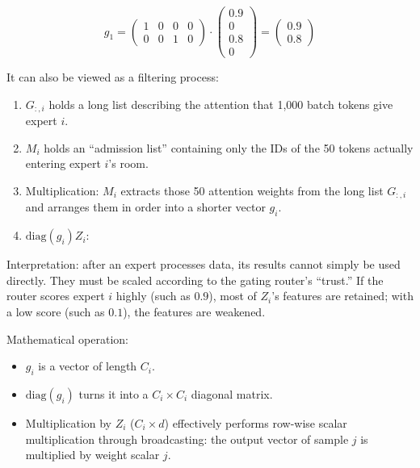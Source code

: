 \[
g_1 =
\begin{pmatrix}
1 & 0 & 0 & 0 \\
0 & 0 & 1 & 0
\end{pmatrix}
\cdot
\begin{pmatrix}
0.9 \\
0 \\
0.8 \\
0
\end{pmatrix}
=
\begin{pmatrix}
0.9 \\
0.8
\end{pmatrix}
\]

It can also be viewed as a filtering process:

\begin{enumerate}
\def\labelenumi{\arabic{enumi}.}
\item
  \(G_{:,i}\) holds a long list describing the attention that 1,000 batch tokens give expert \(i\).
\item
  \(M_i\) holds an ``admission list'' containing only the IDs of the 50 tokens actually entering expert \(i\)'s room.
\item
  Multiplication: \(M_i\) extracts those 50 attention weights from the long list \(G_{:,i}\) and arranges them in order into a shorter vector \(g_i\).
\item
{}
  \(\mathrm{diag}(g_i)Z_i\):
\end{enumerate}

Interpretation: after an expert processes data, its results cannot simply be used directly. They must be scaled according to the gating router's ``trust.'' If the router scores expert \(i\) highly (such as \(0.9\)), most of \(Z_i\)'s features are retained; with a low score (such as \(0.1\)), the features are weakened.

Mathematical operation:

\begin{itemize}
\tightlist
\item
  \(g_i\) is a vector of length \(C_i\).
\item
  \(\mathrm{diag}(g_i)\) turns it into a \(C_i \times C_i\) diagonal matrix.
\item
  Multiplication by \(Z_i\) (\(C_i \times d\)) effectively performs row-wise scalar multiplication through broadcasting: the output vector of sample \(j\) is multiplied by weight scalar \(j\).
\end{itemize}

